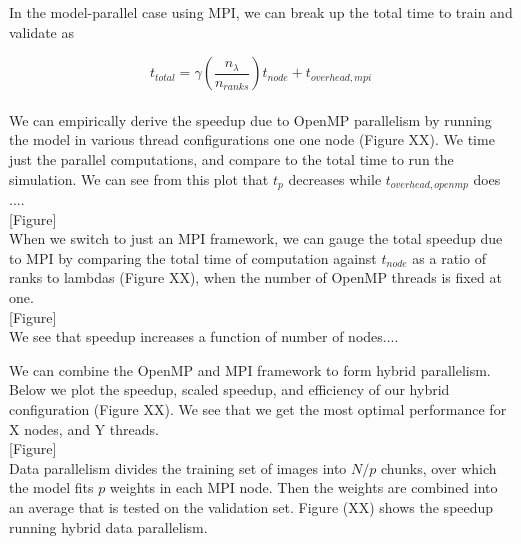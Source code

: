 \documentclass[article,12pt]{article}
\begin{document}
In the model-parallel case using MPI, we can break up the total time to train and validate as

$$t_{total} = \gamma \left(\frac{n_{\lambda}}{n_{ranks}} \right) t_{node}  + t_{overhead, mpi}$$\\

We can empirically derive the speedup due to OpenMP parallelism by running the model in various thread configurations one one node (Figure XX). We time just the parallel computations, and compare to the total time to run the simulation. We can see from this plot that $t_p$ decreases while $ t_{overhead, openmp}$ does ....\\

[Figure]\\

When we switch to just an MPI framework, we can gauge the total speedup due to MPI by comparing the total time of computation against $t_{node}$ as a ratio of ranks to lambdas (Figure XX), when the number of OpenMP threads is fixed at one.\\

[Figure]\\

We see that speedup increases a function of number of nodes....

We can combine the OpenMP and MPI framework to form hybrid parallelism. Below we plot the speedup, scaled speedup, and efficiency of our hybrid configuration (Figure XX). We see that we get the most optimal performance for X nodes, and Y threads. \\

[Figure] \\

Data parallelism divides the training set of images into $N/p$ chunks, over which the model fits $p$ weights in each MPI node. Then the weights are combined into an average that is tested on the validation set. Figure (XX) shows the speedup running hybrid data parallelism.





\end{document}
